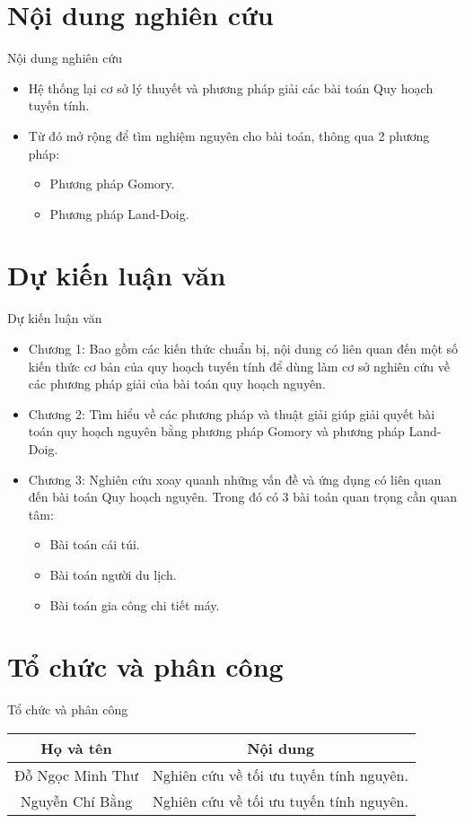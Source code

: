 \documentclass{beamer}
\begin{document}
\section{Nội dung nghiên cứu}
\begin{frame}{Nội dung nghiên cứu}
    \begin{itemize}
    \item Hệ thống lại cơ sở lý thuyết và phương pháp giải các bài toán Quy hoạch tuyến tính.
    \item Từ đó mở rộng để tìm nghiệm nguyên cho bài toán, thông qua 2 phương pháp:
    \begin{itemize}
    \item Phương pháp Gomory.
    \item Phương pháp Land-Doig.
    \end{itemize}
    \end{itemize}
\end{frame}
\section{Dự kiến luận văn}
\begin{frame}{Dự kiến luận văn}
    \begin{itemize}
    \item Chương 1:  Bao gồm các kiến thức chuẩn bị, nội dung có liên quan đến
    một số kiến thức cơ bản của quy hoạch tuyến tính để dùng
    làm cơ sở nghiên cứu về các phương pháp giải của bài toán quy hoạch nguyên.
    \item Chương 2: Tìm hiểu về các phương pháp và thuật giải giúp giải quyết bài toán quy hoạch nguyên bằng phương pháp Gomory và phương pháp Land-Doig.
    \item Chương 3: Nghiên cứu xoay quanh những vấn đề và ứng dụng có liên quan đến bài toán Quy hoạch nguyên. Trong đó có 3 bài toán quan trọng cần quan tâm:
    \begin{itemize}
        \item Bài toán cái túi.
        \item Bài toán người du lịch.
        \item Bài toán gia công chi tiết máy. 
    \end{itemize}
    \end{itemize}   
\end{frame}
\section{Tổ chức và phân công}
\begin{frame}{Tổ chức và phân công}
    \begin{table}
        \begin{tabular}{|c|c|}
            \hline
            Họ và tên & Nội dung \\
            \hline \hline
            Đỗ Ngọc Minh Thư & Nghiên cứu về tối ưu tuyến tính nguyên. \\
            Nguyễn Chí Bằng & Nghiên cứu về tối ưu tuyến tính nguyên. \\
            \hline
        \end{tabular}
    \end{table}
\end{frame}
\end{document}
